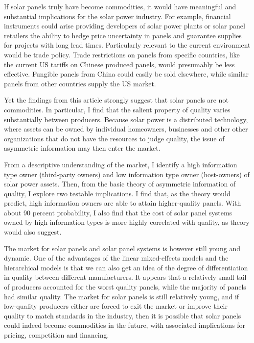 \documentclass[a4paper]{article}
\begin{document}
If solar panels truly have become commodities, it would have meaningful and substantial implications for the solar power industry. For example, financial instruments could arise providing developers of solar power plants or solar panel retailers the ability to hedge price uncertainty in panels and guarantee supplies for projects with long lead times. Particularly relevant to the current environment would be trade policy. Trade restrictions on panels from specific countries, like the current US tariffs on Chinese produced panels, would presumably be less effective. Fungible panels from China could easily be sold elsewhere, while similar panels from other countries supply the US market.

Yet the findings from this article strongly suggest that solar panels are not commodities. In particular, I find that the salient property of quality varies substantially between producers. Because solar power is a distributed technology, where assets can be owned by individual homeowners, businesses and other other organizations that do not have the resources to judge quality, the issue of asymmetric information may then enter the market.

From a descriptive understanding of the market, I identify a high information type owner (third-party owners) and low information type owner (host-owners) of solar power assets. Then, from the basic theory of asymmetric information of quality, I explore two testable implications. I find that, as the theory would predict, high information owners are able to attain higher-quality panels. With about 90 percent probability, I also find that the cost of solar panel systems owned by high-information types is more highly correlated with quality, as theory would also suggest.

The market for solar panels and solar panel systems is however still young and dynamic. One of the advantages of the linear mixed-effects models and the hierarchical models is that we can also get an idea of the degree of differentiation in quality between different manufacturers. It appears that a relatively small tail of producers accounted for the worst quality panels, while the majority of panels had similar quality. The market for solar panels is still relatively young, and if low-quality producers either are forced to exit the market or improve their quality to match standards in the industry, then it is possible that solar panels could indeed become commodities in the future, with associated implications for pricing, competition and financing.





\end{document}
